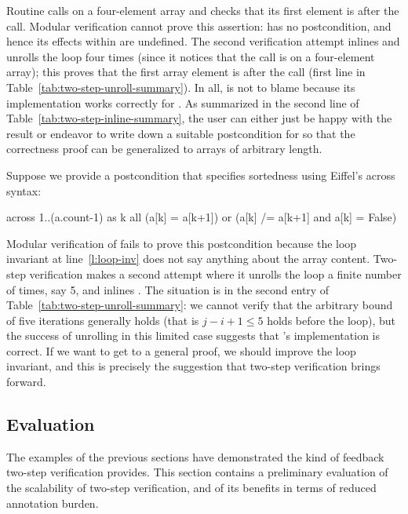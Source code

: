 Routine  calls  on a four-element array and checks that its first element is  after the call.
Modular verification cannot prove this assertion:  has no postcondition, and hence its effects within  are undefined.
The second verification attempt inlines  and unrolls the loop four times (since it notices that the call is on a four-element array); this proves that the first array element is  after the call (first line in Table~\ref{tab:two-step-unroll-summary}).
In all,  is not to blame because its implementation works correctly for .
As summarized in the second line of Table~\ref{tab:two-step-inline-summary}, the user can either just be happy with the result or endeavor to write down a suitable postcondition for  so that the correctness proof can be generalized to arrays of arbitrary length.

Suppose we provide a postcondition that specifies sortedness using Eiffel's across syntax:
\begin{erunning}
across 1..(a.count-1) as k all
				(a[k] = a[k+1]) or (a[k] /= a[k+1] and a[k] = False)
\end{erunning}
Modular verification of  fails to prove this postcondition because the loop invariant at line~\ref{l:loop-inv} does not say anything about the array content.
Two-step verification makes a second attempt where it unrolls the loop a finite number of times, say 5, and inlines .
The situation is in the second entry of Table~\ref{tab:two-step-unroll-summary}: we cannot verify that the arbitrary bound of five iterations generally holds (that is $j - i + 1 \leq 5$ holds before the loop), but the success of unrolling in this limited case suggests that 's implementation is correct.
If we want to get to a general proof, we should improve the loop invariant, and this is precisely the suggestion that two-step verification brings forward.



\subsection{Evaluation}\label{evaluation}

The examples of the previous sections have demonstrated the kind of feedback two-step verification provides.
This section contains a preliminary evaluation of the scalability of two-step verification, and of its benefits in terms of reduced annotation burden.

